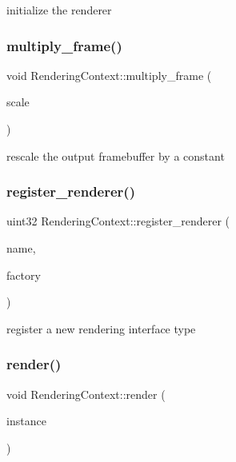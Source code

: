 initialize the renderer \mbox{\label{struct_rendering_context_a332a91e18bd96ae06973cc897c34ff07}} 
\subsubsection{\texorpdfstring{multiply\+\_\+frame()}{multiply\_frame()}}
{\footnotesize\ttfamily void Rendering\+Context\+::multiply\+\_\+frame (\begin{DoxyParamCaption}\item[{const float}]{scale }\end{DoxyParamCaption})}

rescale the output framebuffer by a constant \mbox{\label{struct_rendering_context_a69b3e0b8c8cc4aaf4a9751529f86ca68}} 
\subsubsection{\texorpdfstring{register\+\_\+renderer()}{register\_renderer()}}
{\footnotesize\ttfamily uint32 Rendering\+Context\+::register\+\_\+renderer (\begin{DoxyParamCaption}\item[{const char $\ast$}]{name,  }\item[{Renderer\+Factory\+Function}]{factory }\end{DoxyParamCaption})}

register a new rendering interface type \mbox{\label{struct_rendering_context_a2cdc9b5c263a871ec466e60b9e215c6d}} 
\subsubsection{\texorpdfstring{render()}{render()}}
{\footnotesize\ttfamily void Rendering\+Context\+::render (\begin{DoxyParamCaption}\item[{const uint32}]{instance }\end{DoxyParamCaption})}


